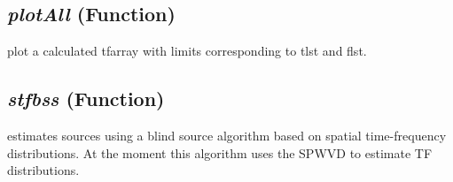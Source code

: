 \subsection{\textit{plotAll} (Function)}
\label{ssec:processing.tftools.plotAll}

plot a calculated tfarray with 
    limits corresponding to tlst and flst.

\subsection{\textit{stfbss} (Function)}
\label{ssec:processing.tftools.stfbss}

estimates sources using a blind source algorithm based on spatial 
    time-frequency distributions.  At the moment this algorithm uses the SPWVD 
    to estimate TF distributions. 
